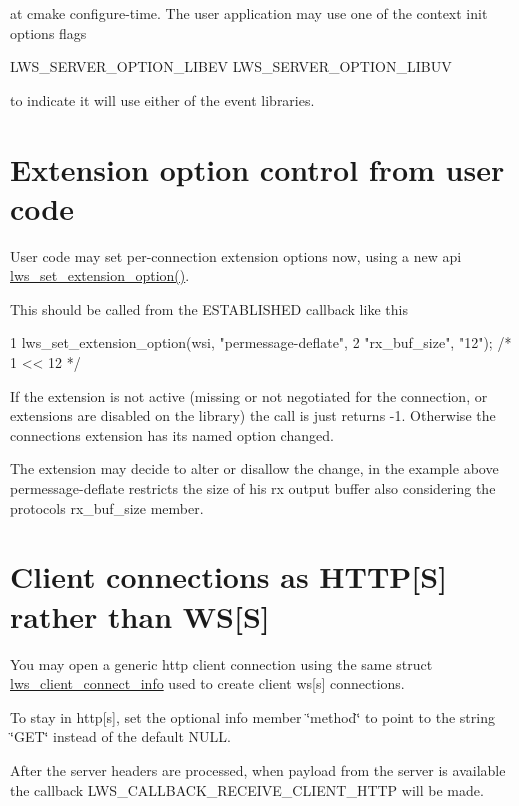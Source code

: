 at cmake configure-\/time. The user application may use one of the context init options flags \begin{DoxyVerb}    LWS_SERVER_OPTION_LIBEV
    LWS_SERVER_OPTION_LIBUV
\end{DoxyVerb}


to indicate it will use either of the event libraries.\hypertarget{md_README.coding_extopts}{}\section{Extension option control from user code}\label{md_README.coding_extopts}
User code may set per-\/connection extension options now, using a new api {\ttfamily \hyperlink{group__extensions_gae0e24e1768f83a7fb07896ce975704b9}{lws\+\_\+set\+\_\+extension\+\_\+option()}}.

This should be called from the E\+S\+T\+A\+B\+L\+I\+S\+H\+ED callback like this 
\begin{DoxyCode}
1 lws\_set\_extension\_option(wsi, "permessage-deflate",
2                          "rx\_buf\_size", "12"); /* 1 << 12 */
\end{DoxyCode}


If the extension is not active (missing or not negotiated for the connection, or extensions are disabled on the library) the call is just returns -\/1. Otherwise the connection\textquotesingle{}s extension has its named option changed.

The extension may decide to alter or disallow the change, in the example above permessage-\/deflate restricts the size of his rx output buffer also considering the protocol\textquotesingle{}s rx\+\_\+buf\+\_\+size member.\hypertarget{md_README.coding_httpsclient}{}\section{Client connections as H\+T\+T\+P\mbox{[}\+S\mbox{]} rather than W\+S\mbox{[}\+S\mbox{]}}\label{md_README.coding_httpsclient}
You may open a generic http client connection using the same struct \hyperlink{structlws__client__connect__info}{lws\+\_\+client\+\_\+connect\+\_\+info} used to create client ws\mbox{[}s\mbox{]} connections.

To stay in http\mbox{[}s\mbox{]}, set the optional info member \char`\"{}method\char`\"{} to point to the string \char`\"{}\+G\+E\+T\char`\"{} instead of the default N\+U\+LL.

After the server headers are processed, when payload from the server is available the callback L\+W\+S\+\_\+\+C\+A\+L\+L\+B\+A\+C\+K\+\_\+\+R\+E\+C\+E\+I\+V\+E\+\_\+\+C\+L\+I\+E\+N\+T\+\_\+\+H\+T\+TP will be made.

